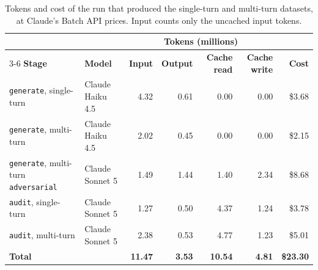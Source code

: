 \begin{table}[H]
    \centering
    \small
    \setlength{\tabcolsep}{3.5pt}
    \begin{tabular}{@{}llrrrrr@{}}
        \toprule
        & & \multicolumn{4}{c}{\textbf{Tokens (millions)}} & \\
        \cmidrule(lr){3-6}
        \textbf{Stage} & \textbf{Model} & \textbf{Input} & \textbf{Output} & \textbf{Cache read} & \textbf{Cache write} & \textbf{Cost} \\
        \midrule
        \texttt{generate}, single-turn            & Claude Haiku 4.5 & 4.32 & 0.61 & 0.00 & 0.00 & \$3.68 \\
        \texttt{generate}, multi-turn              & Claude Haiku 4.5 & 2.02 & 0.45 & 0.00 & 0.00 & \$2.15 \\
        \texttt{generate}, multi-turn \texttt{adversarial} & Claude Sonnet 5  & 1.49 & 1.44 & 1.40 & 2.34 & \$8.68 \\
        \texttt{audit}, single-turn                & Claude Sonnet 5  & 1.27 & 0.50 & 4.37 & 1.24 & \$3.78 \\
        \texttt{audit}, multi-turn                 & Claude Sonnet 5  & 2.38 & 0.53 & 4.77 & 1.23 & \$5.01 \\
        \midrule
        \textbf{Total} & & \textbf{11.47} & \textbf{3.53} & \textbf{10.54} & \textbf{4.81} & \textbf{\$23.30} \\
        \bottomrule
    \end{tabular}
    \caption[Tokens and cost for the single-turn and multi-turn datasets]{Tokens and cost of the run that produced the single-turn and multi-turn datasets, at Claude's Batch API prices. Input counts only the uncached input tokens.}
    \label{tab:pipeline-cost}
\end{table}

